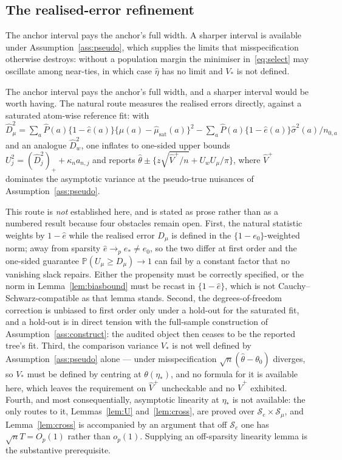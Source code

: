 \documentclass[11pt]{article}
\theoremstyle{plain}
\theoremstyle{definition}
\theoremstyle{remark}
\newcommand{\PP}{\mathbb{P}}
\newcommand{\cS}{\mathcal{S}}
\newcommand{\ez}{e_0}
\newcommand{\ehat}{\widehat{e}}
\newcommand{\mhat}{\widehat{\mu}}
\newcommand{\thetahat}{\widehat{\theta}}
\newcommand{\Vhat}{\widehat{V}}
\newcommand{\Dm}{D_\mu}
\begin{document}
\subsection{The realised-error refinement}\label{sec:realised}

The anchor interval pays the anchor's full width. A sharper interval is
available under Assumption~\ref{ass:pseudo}, which supplies the limits that
misspecification otherwise destroys: without a population margin the minimiser
in~\eqref{eq:select} may oscillate among near-ties, in which case
$\widehat\eta$ has no limit and $V_*$ is not defined.

The anchor interval pays the anchor's full width, and a sharper interval would be
worth having. The natural route measures the realised errors directly, against a
saturated atom-wise reference fit: with
$\widehat D_\mu^2=\sum_a\widehat P(a)\{1-\ehat(a)\}\{\mhat(a)-\mhat_{\mathrm{sat}}(a)\}^2
-\sum_a\widehat P(a)\{1-\ehat(a)\}\widehat\sigma^2(a)/n_{0,a}$
and an analogue $\widehat D_w^2$, one inflates to one-sided upper bounds
$U_j^2=(\widehat D_j^2)_++\kappa_na_{n,j}$ and reports
$\thetahat\pm\{z\sqrt{\Vhat^{+}/n}+U_wU_\mu/\pi\}$, where $\Vhat^{+}$ dominates the
asymptotic variance at the pseudo-true nuisances of
Assumption~\ref{ass:pseudo}.

This route is \emph{not} established here, and is stated as prose rather than as a
numbered result because four obstacles remain open. First, the natural statistic
weights by $1-\ehat$ while the realised error $\Dm$ is defined in the
$\{1-\ez\}$-weighted norm; away from sparsity $\ehat\to_pe_*\ne\ez$, so the two
differ at first order and the one-sided guarantee $\PP(U_\mu\ge\Dm)\to1$ can fail
by a constant factor that no vanishing slack repairs. Either the propensity must be
correctly specified, or the norm in Lemma~\ref{lem:biasbound} must be recast in
$\{1-\ehat\}$, which is not Cauchy--Schwarz-compatible as that lemma stands.
Second, the degrees-of-freedom correction is unbiased to first order only under a
hold-out for the saturated fit, and a hold-out is in direct tension with the
full-sample construction of Assumption~\ref{ass:construct}: the audited object then
ceases to be the reported tree's fit. Third, the comparison variance $V_*$ is not
well defined by Assumption~\ref{ass:pseudo} alone --- under misspecification
$\sqrt n(\thetahat-\theta_0)$ diverges, so $V_*$ must be defined by centring at
$\theta(\eta_*)$, and no formula for it is available here, which leaves the
requirement on $\Vhat^{+}$ uncheckable and no $\Vhat^{+}$ exhibited. Fourth, and
most consequentially, asymptotic linearity at $\eta_*$ is not available: the only
routes to it, Lemmas~\ref{lem:U} and~\ref{lem:cross}, are proved over
$\cS_e\times\cS_\mu$, and Lemma~\ref{lem:cross} is accompanied by an argument that
off $\cS_e$ one has $\sqrt nT=O_p(1)$ rather than $o_p(1)$. Supplying an
off-sparsity linearity lemma is the substantive prerequisite.
\end{document}
